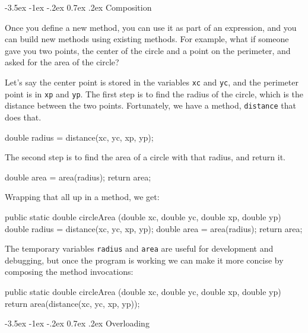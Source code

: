 \documentclass[12pt]{book}
\makeatletter
\renewcommand{\section}{\@startsection {section}{1}{\z@}%
    {-3.5ex \@plus -1ex \@minus -.2ex}%
    {0.7ex \@plus.2ex}%
    {\normalfont\Large\bfseries}}
\theoremstyle{exercise}
\makeatother
\begin{document}
\section{Composition}

Once you define a new method, you can use it as part of an expression, and you can build new methods using existing methods.
For example, what if someone gave you two points, the center of the circle and a point on the perimeter, and asked for the area of the circle?

Let's say the center point is stored in the variables {\tt xc} and {\tt yc}, and the perimeter point is in {\tt xp} and {\tt yp}.
The first step is to find the radius of the circle, which is the distance between the two points.
Fortunately, we have a method, {\tt distance} that does that.

\begin{code}
    double radius = distance(xc, yc, xp, yp);
\end{code}

The second step is to find the area of a circle with that radius, and return it.

\begin{code}
    double area = area(radius);
    return area;
\end{code}

Wrapping that all up in a method, we get:

\begin{code}
    public static double circleArea
            (double xc, double yc, double xp, double yp) {
        double radius = distance(xc, yc, xp, yp);
        double area = area(radius);
        return area;
    }
\end{code}

The temporary variables {\tt radius} and {\tt area} are useful for development and debugging, but once the program is working we can make it more concise by composing the method invocations:

\begin{code}
    public static double circleArea
            (double xc, double yc, double xp, double yp) {
        return area(distance(xc, yc, xp, yp));
    }
\end{code}


\section{Overloading}
\label{overloading}

\end{document}
